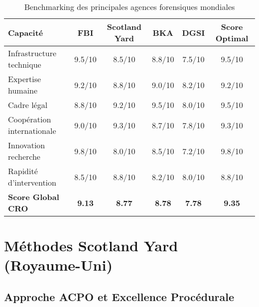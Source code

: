 \begin{table}[h]
\centering
\begin{tabular}{|l|c|c|c|c|c|}
\hline
\textbf{Capacité} & \textbf{FBI} & \textbf{Scotland Yard} & \textbf{BKA} & \textbf{DGSI} & \textbf{Score Optimal} \\
\hline
Infrastructure technique & 9.5/10 & 8.5/10 & 8.8/10 & 7.5/10 & 9.5/10 \\
Expertise humaine & 9.2/10 & 8.8/10 & 9.0/10 & 8.2/10 & 9.2/10 \\
Cadre légal & 8.8/10 & 9.2/10 & 9.5/10 & 8.0/10 & 9.5/10 \\
Coopération internationale & 9.0/10 & 9.3/10 & 8.7/10 & 7.8/10 & 9.3/10 \\
Innovation recherche & 9.8/10 & 8.0/10 & 8.5/10 & 7.2/10 & 9.8/10 \\
Rapidité d'intervention & 8.5/10 & 8.8/10 & 8.2/10 & 8.0/10 & 8.8/10 \\
\hline
\textbf{Score Global CRO} & \textbf{9.13} & \textbf{8.77} & \textbf{8.78} & \textbf{7.78} & \textbf{9.35} \\
\hline
\end{tabular}
\caption{Benchmarking des principales agences forensiques mondiales}
\end{table}

\section{Méthodes Scotland Yard (Royaume-Uni)}

\subsection{Approche ACPO et Excellence Procédurale}


